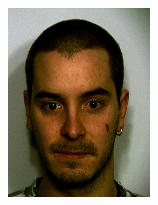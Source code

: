 \begin{figure}[h]
\begin{subfigure}[b]{0.18\textwidth}
         \includegraphics[width=\textwidth]{images/results/base/hh78.color.d3_x.png}
     \end{subfigure}
     \hfill
     \begin{subfigure}[b]{0.18\textwidth}
         \centering

\end{subfigure}
\end{figure}
